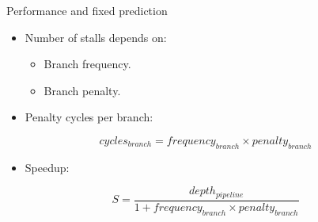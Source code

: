 \begin{frame}[t]{Performance and fixed prediction}
\begin{itemize}
  \item Number of stalls depends on:
    \begin{itemize}
      \item Branch frequency.
      \item Branch penalty.
    \end{itemize}
\end{itemize}

\begin{itemize}
  \item Penalty cycles per branch:
\end{itemize}
\begin{displaymath}
cycles_{branch} = frequency_{branch} \times penalty_{branch}
\end{displaymath}

\begin{itemize}
  \item Speedup:
\end{itemize}
\begin{displaymath}
S =
\frac{depth_{pipeline}}{1 + frequency_{branch} \times penalty_{branch}}
\end{displaymath}
\end{frame}

